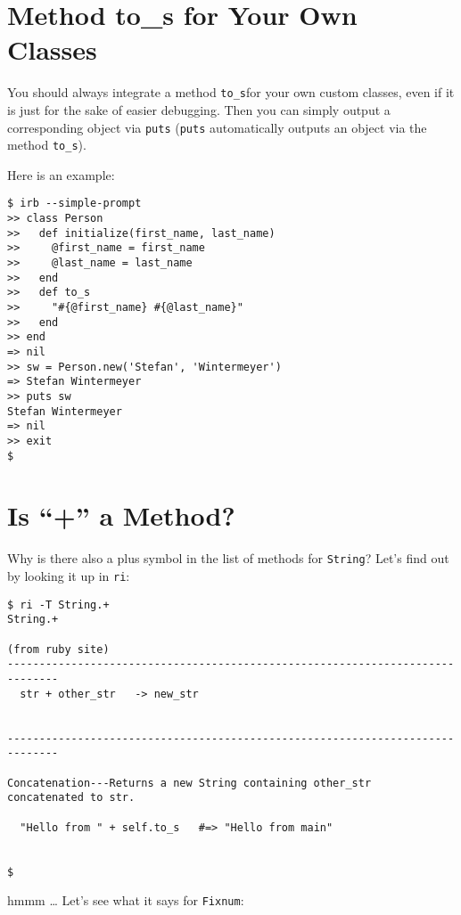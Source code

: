 \documentclass[a4paper]{book}
\begin{document}
\section{Method to\_s for Your Own Classes}\label{method-toux5fs-for-your-own-classes}

You should always integrate a method \texttt{to\_s}for your own custom classes, even if it is just for the sake of easier debugging. Then you can simply output a corresponding object via \texttt{puts} (\texttt{puts} automatically outputs an object via the method \texttt{to\_s}).

Here is an example:

\begin{shaded}\begin{verbatim}
$ irb --simple-prompt
>> class Person
>>   def initialize(first_name, last_name)
>>     @first_name = first_name
>>     @last_name = last_name
>>   end
>>   def to_s
>>     "#{@first_name} #{@last_name}"
>>   end
>> end
=> nil
>> sw = Person.new('Stefan', 'Wintermeyer')
=> Stefan Wintermeyer
>> puts sw
Stefan Wintermeyer
=> nil
>> exit
$
\end{verbatim}\end{shaded}

\section{Is “+” a Method?}\label{is-a-method}

Why is there also a plus symbol in the list of methods for \texttt{String}? Let's find out by looking it up in \texttt{ri}:

\begin{shaded}\begin{verbatim}
$ ri -T String.+
String.+

(from ruby site)
------------------------------------------------------------------------------
  str + other_str   -> new_str


------------------------------------------------------------------------------

Concatenation---Returns a new String containing other_str
concatenated to str.

  "Hello from " + self.to_s   #=> "Hello from main"


$
\end{verbatim}\end{shaded}

hmmm \ldots{} Let's see what it says for \texttt{Fixnum}:
\end{document}

